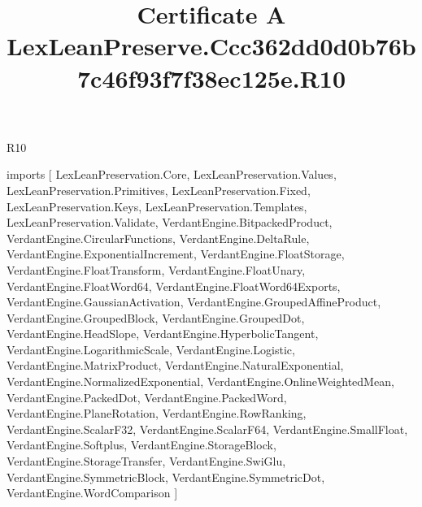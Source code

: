 \begin{lexlean}{R10}
\title{Certificate A LexLeanPreserve.Ccc362dd0d0b76b7c46f93f7f38ec125e.R10}
\begin{coremodule}
imports [
  LexLeanPreservation.Core,
  LexLeanPreservation.Values,
  LexLeanPreservation.Primitives,
  LexLeanPreservation.Fixed,
  LexLeanPreservation.Keys,
  LexLeanPreservation.Templates,
  LexLeanPreservation.Validate,
  VerdantEngine.BitpackedProduct,
  VerdantEngine.CircularFunctions,
  VerdantEngine.DeltaRule,
  VerdantEngine.ExponentialIncrement,
  VerdantEngine.FloatStorage,
  VerdantEngine.FloatTransform,
  VerdantEngine.FloatUnary,
  VerdantEngine.FloatWord64,
  VerdantEngine.FloatWord64Exports,
  VerdantEngine.GaussianActivation,
  VerdantEngine.GroupedAffineProduct,
  VerdantEngine.GroupedBlock,
  VerdantEngine.GroupedDot,
  VerdantEngine.HeadSlope,
  VerdantEngine.HyperbolicTangent,
  VerdantEngine.LogarithmicScale,
  VerdantEngine.Logistic,
  VerdantEngine.MatrixProduct,
  VerdantEngine.NaturalExponential,
  VerdantEngine.NormalizedExponential,
  VerdantEngine.OnlineWeightedMean,
  VerdantEngine.PackedDot,
  VerdantEngine.PackedWord,
  VerdantEngine.PlaneRotation,
  VerdantEngine.RowRanking,
  VerdantEngine.ScalarF32,
  VerdantEngine.ScalarF64,
  VerdantEngine.SmallFloat,
  VerdantEngine.Softplus,
  VerdantEngine.StorageBlock,
  VerdantEngine.StorageTransfer,
  VerdantEngine.SwiGlu,
  VerdantEngine.SymmetricBlock,
  VerdantEngine.SymmetricDot,
  VerdantEngine.WordComparison
]


\end{coremodule}
\end{lexlean}
